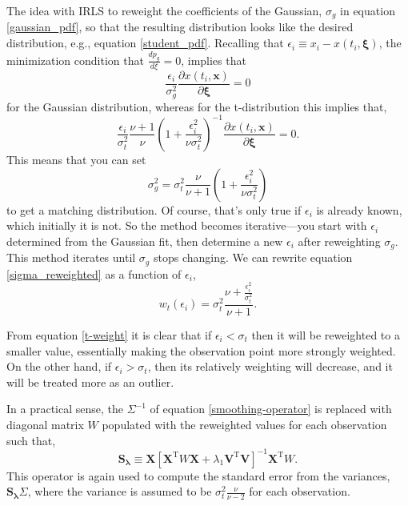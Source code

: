 \documentclass[twocol]{ametsoc}
\begin{document}
The idea with IRLS to reweight the coefficients of the Gaussian, $\sigma_g$ in equation \ref{gaussian_pdf}, so that the resulting distribution looks like the desired distribution, e.g., equation \ref{student_pdf}. Recalling that $\epsilon_i \equiv x_i - x(t_i,\mathbf{\xi})$, the minimization condition that $\frac{d p_g}{d\xi}=0$, implies that
\begin{equation}
\frac{\epsilon_i}{\sigma_g^2} \frac{\partial x(t_i,\mathbf{x})}{\partial \mathbf{\xi}} = 0
\end{equation}
for the Gaussian distribution, whereas for the t-distribution this implies that,
\begin{equation}
 \frac{\epsilon_i}{\sigma_t^2} \frac{\nu+1}{\nu} \left( 1 + \frac{\epsilon_i^2}{\nu \sigma_t^2} \right)^{-1}  \frac{\partial x(t_i,\mathbf{x})}{\partial \mathbf{\xi}}  = 0.
\end{equation}
This means that you can set
\begin{equation}
\sigma_g^2 =   \sigma_t^2 \frac{\nu}{\nu+1} \left( 1 + \frac{\epsilon_i^2}{\nu \sigma_t^2} \right)
\label{sigma_reweighted}
\end{equation}
to get a matching distribution. Of course, that's only true if $\epsilon_i$ is already known, which initially it is not. So the method becomes iterative---you start with $\epsilon_i$ determined from the Gaussian fit, then determine a new $\epsilon_i$ after reweighting $\sigma_g$. This method iterates until $\sigma_g$ stops changing. We can rewrite equation \ref{sigma_reweighted} as a function of $\epsilon_i$,
\begin{equation}
\label{t-weight}
w_t(\epsilon_i) = \sigma_t^2 \frac{\nu  + \frac{\epsilon_i^2}{\sigma_t^2}}{\nu+1}.
\end{equation}

From equation \ref{t-weight} it is clear that if $\epsilon_i < \sigma_t$ then it will be reweighted to a smaller value, essentially making the observation point more strongly weighted. On the other hand, if $\epsilon_i > \sigma_t$, then its relatively weighting will decrease, and it will be treated more as an outlier.

In a practical sense, the $\Sigma^{-1}$ of equation \ref{smoothing-operator} is replaced with diagonal matrix $W$ populated with the reweighted values for each observation such that,
\begin{equation}
\label{general-smoothing-operator}
\mathbf{S_\lambda} \equiv \mathbf{X} \left[ \mathbf{X}^{\textrm{T}} W \mathbf{X} + \lambda_1 \mathbf{V}^{\textrm{T}} \mathbf{V} \right]^{-1} \mathbf{X}^{\textrm{T}} W.
\end{equation}
This operator is again used to compute the standard error from the variances,  $\mathbf{S_\lambda} \Sigma$, where the variance is assumed to be $\sigma_t^2 \frac{\nu}{\nu-2}$ for each observation.
\end{document}
